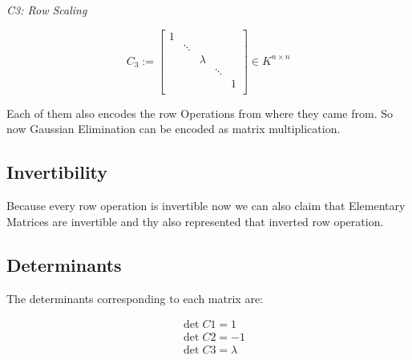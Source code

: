 \emph{C3: Row Scaling}

\[
       C_3 := 
       \begin{bmatrix}
       1      &        &        &        &        \\
              & \ddots &        &        &        \\
              &        & \lambda &       &        \\
              &        &        & \ddots &        \\
              &        &        &        & 1      \\
       \end{bmatrix}
       \in K^{n \times n}
\]

Each of them also encodes the row Operations from where they came from.
So now Gaussian Elimination can be encoded as matrix multiplication.

\subsection{Invertibility}

Because every row operation is invertible now we can also claim that
Elementary Matrices are invertible and thy also represented that inverted row operation.

\subsection{Determinants}

The determinants corresponding to each matrix are:

\begin{align*}
       &\det C1 = 1\\
       &\det C2 = -1\\
       &\det C3 = \lambda
\end{align*}

